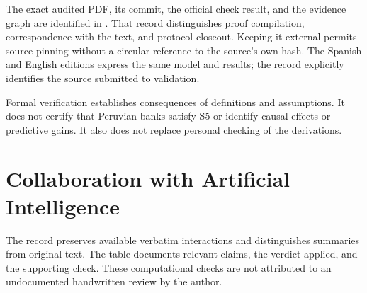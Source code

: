 \documentclass[11pt]{article}
\theoremstyle{definition}\newtheorem{assumption}{Assumption}
\begin{document}
The exact audited PDF, its commit, the official check result, and the evidence
graph are identified in
\href{https://github.com/fgalarzac/ai-project/blob/main/docs/lean_progreso.md}{}.
That record distinguishes proof compilation, correspondence with the text,
and protocol closeout. Keeping it external permits source pinning without
a circular reference to the source's own hash. The Spanish and English
editions express the same model and results; the record explicitly identifies
the source submitted to validation.

Formal verification establishes consequences of definitions and assumptions.
It does not certify that Peruvian banks satisfy S5 or identify causal effects
or predictive gains. It also does not replace personal checking of the
derivations.

\clearpage
\section{Collaboration with Artificial Intelligence}
The  record preserves available verbatim interactions and
distinguishes summaries from original text. The table documents relevant
claims, the verdict applied, and the supporting check. These computational
checks are not attributed to an undocumented handwritten review by the author.
\end{document}
